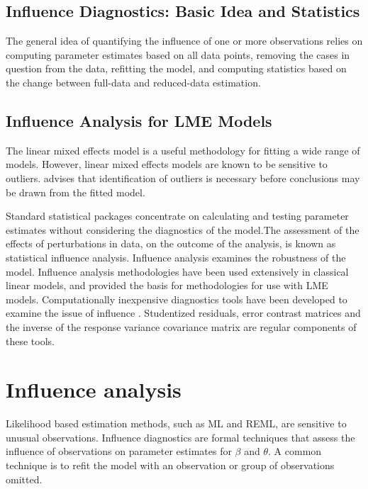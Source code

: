 \documentclass[12pt, a4paper]{article}
\begin{document}

\subsection{Influence Diagnostics: Basic Idea and Statistics} %

The general idea of quantifying the influence of one or more observations relies on computing parameter estimates based on all data points, removing the cases in question from the data, refitting the model, and computing statistics based on the change between full-data and reduced-data estimation. 



\subsection{Influence Analysis for LME Models} %
The linear mixed effects model is a useful methodology for fitting a wide range of models. However, linear mixed effects models are known to be sensitive to outliers. \citet{CPJ} advises that identification of outliers is necessary before conclusions may be drawn from the fitted model.

Standard statistical packages concentrate on calculating and testing parameter estimates without considering the diagnostics of the model.The assessment of the effects of perturbations in data, on the outcome of the analysis, is known as statistical influence analysis. Influence analysis examines the robustness of the model. Influence analysis methodologies have been used extensively in classical linear models, and provided the basis for methodologies for use with LME models.
Computationally inexpensive diagnostics tools have been developed to examine the issue of influence \citep{Zewotir}.
Studentized residuals, error contrast matrices and the inverse of the response variance covariance matrix are regular components of these tools.


\section{Influence analysis} %

Likelihood based estimation methods, such as ML and REML, are sensitive to unusual observations. Influence diagnostics are formal techniques that assess the influence of observations on parameter estimates for $\beta$ and $\theta$. A common technique is to refit the model with an observation or group of observations omitted.
\end{document}
